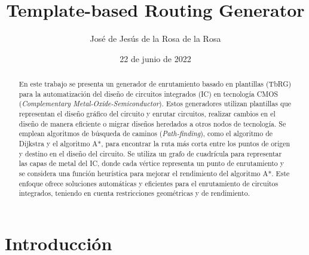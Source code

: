 \documentclass[reprint,amsmath,amssymb,aps]{revtex4-2}
\begin{document}

\title{Template-based Routing Generator}
\author{José de Jesús de la Rosa de la Rosa}
\date{22 de junio de 2022}

\begin{abstract}
En este trabajo se presenta un generador de enrutamiento basado en plantillas (TbRG) para la automatización del diseño de circuitos integrados (IC) en tecnología CMOS (\textit{Complementary Metal-Oxide-Semiconductor}). Estos generadores utilizan plantillas que representan el diseño gráfico del circuito y enrutar circuitos, realizar cambios en el diseño de manera eficiente o migrar diseños heredados a otros nodos de tecnología. Se emplean algoritmos de búsqueda de caminos (\textit{Path-finding}), como el algoritmo de Dijkstra y el algoritmo A*, para encontrar la ruta más corta entre los puntos de origen y destino en el diseño del circuito. Se utiliza un grafo de cuadrícula para representar las capas de metal del IC, donde cada vértice representa un punto de enrutamiento y se considera una función heurística para mejorar el rendimiento del algoritmo A*. Este enfoque ofrece soluciones automáticas y eficientes para el enrutamiento de circuitos integrados, teniendo en cuenta restricciones geométricas y de rendimiento.
\end{abstract}


\maketitle 

\section{Introducción}
\end{document}
